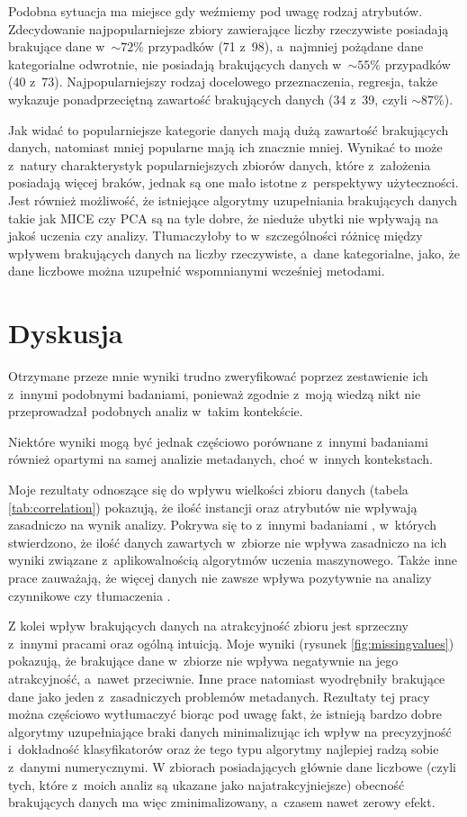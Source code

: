 Podobna sytuacja ma miejsce gdy weźmiemy pod uwagę rodzaj atrybutów.
Zdecydowanie najpopularniejsze zbiory zawierające liczby rzeczywiste posiadają brakujące dane w~\(\sim 72\%\) przypadków (71 z~98), a~najmniej pożądane dane kategorialne odwrotnie, nie posiadają brakujących danych w~\(\sim 55\%\) przypadków (40 z~73).
Najpopularniejszy rodzaj docelowego przeznaczenia, regresja, także wykazuje ponadprzeciętną zawartość brakujących danych (34 z~39, czyli \(\sim 87\%\)).

Jak widać to popularniejsze kategorie danych mają dużą zawartość brakujących danych, natomiast mniej popularne mają ich znacznie mniej.
Wynikać to może z~natury charakterystyk popularniejszych zbiorów danych, które z~założenia posiadają więcej braków, jednak są one mało istotne z~perspektywy użyteczności.
Jest również możliwość, że istniejące algorytmy uzupełniania brakujących danych takie jak MICE czy PCA są na tyle dobre, że nieduże ubytki nie wpływają na jakoś uczenia czy analizy.
Tłumaczyłoby to w~szczególności różnicę między wpływem brakujących danych na liczby rzeczywiste, a~dane kategorialne, jako, że dane liczbowe można uzupełnić wspomnianymi wcześniej metodami.

\section{Dyskusja}

Otrzymane przeze mnie wyniki trudno zweryfikować poprzez zestawienie ich z~innymi podobnymi badaniami, ponieważ zgodnie z~moją wiedzą nikt nie przeprowadzał podobnych analiz w~takim kontekście.

Niektóre wyniki mogą być jednak częściowo porównane z~innymi badaniami również opartymi na samej analizie metadanych, choć w~innych kontekstach.

Moje rezultaty odnoszące się do wpływu wielkości zbioru danych (tabela \ref{tab:correlation}) pokazują, że ilość instancji oraz atrybutów nie wpływają zasadniczo na wynik analizy.
Pokrywa się to z~innymi badaniami \cite{brazdil1994characterizing}, w~których stwierdzono, że ilość danych zawartych w~zbiorze nie wpływa zasadniczo na ich wyniki związane z~aplikowalnością algorytmów uczenia maszynowego.
Także inne prace zauważają, że więcej danych nie zawsze wpływa pozytywnie na analizy czynnikowe \cite{boivin2006more} czy tłumaczenia \cite{gasco2012does}.

Z kolei wpływ brakujących danych na atrakcyjność zbioru jest sprzeczny z~innymi pracami oraz ogólną intuicją.
Moje wyniki (rysunek \ref{fig:missingvalues}) pokazują, że brakujące dane w~zbiorze nie wpływa negatywnie na jego atrakcyjność, a~nawet przeciwnie.
Inne prace \cite{yasser2011analysis} natomiast wyodrębniły brakujące dane jako jeden z~zasadniczych problemów metadanych.
Rezultaty tej pracy można częściowo wytłumaczyć biorąc pod uwagę fakt, że istnieją bardzo dobre algorytmy uzupełniające braki danych minimalizując ich wpływ na precyzyjność i~dokładność klasyfikatorów \cite{acuna2004treatment} oraz że tego typu algorytmy najlepiej radzą sobie z~danymi numerycznymi.
W zbiorach posiadających głównie dane liczbowe (czyli tych, które z~moich analiz są ukazane jako najatrakcyjniejsze) obecność brakujących danych ma więc zminimalizowany, a~czasem nawet zerowy efekt.

